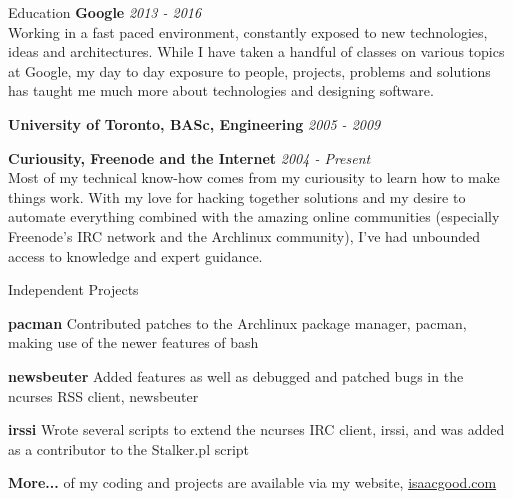 \documentclass{resume}
\begin{document}
  \begin{rSection}{Education}
    {\bf Google} \hfill {\em 2013 - 2016} \\
    { Working in a fast paced environment, constantly exposed to new technologies, ideas and architectures. While I have taken a handful of classes on various topics at Google, my day to day exposure to people, projects, problems and solutions has taught me much more about technologies and designing software. }

    {\bf University of Toronto, BASc, Engineering} \hfill {\em 2005 - 2009}

\begin{comment}
    { \small Key courses: Computer Programming, Algorithms, Data Structures and Languages (A+); Communication and Design I \& II (A- \& A+); Operating Systems (A); Algorithms and Data Structures (A+); Introduction to Databases (A); Compilers and Interpreters (A+); Computer Systems Programming (A+); Computer Networks (A); Computer Security (A); Parallel Programming (A); Optimizing Compilers (A-) } \\
    { GPA: 3.08 }
\end{comment}

    {\bf Curiousity, Freenode and the Internet} \hfill {\em 2004 - Present} \\
    { Most of my technical know-how comes from my curiousity to learn how to make things work. With my love for hacking together solutions and my desire to automate everything combined with the amazing online communities (especially Freenode's IRC network and the Archlinux community), I've had unbounded access to knowledge and expert guidance.}

  \end{rSection}

  \begin{rSection}{Independent Projects}
    \begin{rSubsection}{}{}{}{}
      \item \textbf{pacman} Contributed patches to the Archlinux package manager, pacman, making use of the newer features of bash
      \item \textbf{newsbeuter} Added features as well as debugged and patched bugs in the ncurses RSS client, newsbeuter
      \item \textbf{irssi} Wrote several scripts to extend the ncurses IRC client, irssi, and was added as a contributor to the Stalker.pl script
      \item \textbf{More...} of my coding and projects are available via my website, \href{http://www.isaacgood.com/}{isaacgood.com}
    \end{rSubsection}
  \end{rSection}
\end{document}
